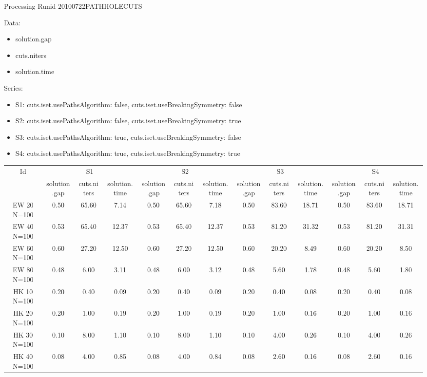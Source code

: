 \documentclass[landscape, 12pt]{report}
\begin{document}
	Processing Runid 20100722PATHHOLECUTS

Data:
\begin{itemize}
\item solution.gap
\item cuts.niters
\item solution.time
\end{itemize}
Series:
\begin{itemize}
\item S1: cuts.iset.usePathsAlgorithm: false, cuts.iset.useBreakingSymmetry: false
\item S2: cuts.iset.usePathsAlgorithm: false, cuts.iset.useBreakingSymmetry: true
\item S3: cuts.iset.usePathsAlgorithm: true, cuts.iset.useBreakingSymmetry: false
\item S4: cuts.iset.usePathsAlgorithm: true, cuts.iset.useBreakingSymmetry: true
\end{itemize}
\begin{tabular}{|c|ccc|ccc|ccc|ccc|}
\hline
\multicolumn{1}{|c|}{Id} & \multicolumn{3}{|c|}{S1} & \multicolumn{3}{|c|}{S2} & \multicolumn{3}{|c|}{S3} & \multicolumn{3}{|c|}{S4}
\\
 & solution.gap & cuts.niters & solution.time & solution.gap & cuts.niters & solution.time & solution.gap & cuts.niters & solution.time & solution.gap & cuts.niters & solution.time
\\
\hline
EW 20 N=100 & 0.50 & 65.60 & 7.14 & 0.50 & 65.60 & 7.18 & 0.50 & 83.60 & 18.71 & 0.50 & 83.60 & 18.71
\\
EW 40 N=100 & 0.53 & 65.40 & 12.37 & 0.53 & 65.40 & 12.37 & 0.53 & 81.20 & 31.32 & 0.53 & 81.20 & 31.31
\\
EW 60 N=100 & 0.60 & 27.20 & 12.50 & 0.60 & 27.20 & 12.50 & 0.60 & 20.20 & 8.49 & 0.60 & 20.20 & 8.50
\\
EW 80 N=100 & 0.48 & 6.00 & 3.11 & 0.48 & 6.00 & 3.12 & 0.48 & 5.60 & 1.78 & 0.48 & 5.60 & 1.80
\\
HK 10 N=100 & 0.20 & 0.40 & 0.09 & 0.20 & 0.40 & 0.09 & 0.20 & 0.40 & 0.08 & 0.20 & 0.40 & 0.08
\\
HK 20 N=100 & 0.20 & 1.00 & 0.19 & 0.20 & 1.00 & 0.19 & 0.20 & 1.00 & 0.16 & 0.20 & 1.00 & 0.16
\\
HK 30 N=100 & 0.10 & 8.00 & 1.10 & 0.10 & 8.00 & 1.10 & 0.10 & 4.00 & 0.26 & 0.10 & 4.00 & 0.26
\\
HK 40 N=100 & 0.08 & 4.00 & 0.85 & 0.08 & 4.00 & 0.84 & 0.08 & 2.60 & 0.16 & 0.08 & 2.60 & 0.16
\\
\hline 
 \end{tabular}
	
\end{document}
